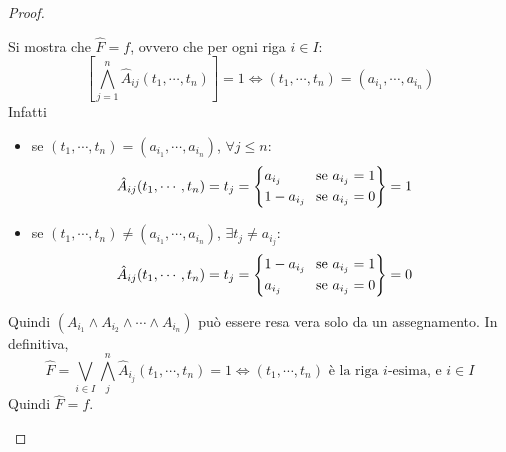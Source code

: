 \begin{proof}
\begin{itemize}
  Si mostra che $\hat{F} = f$, ovvero che per ogni riga $i \in I$:
  $$
  {[ \bigwedge\limits_ {j = 1}^{n} \hat{A}_{ij}(t_1, \cdots, t_n) ]} = 1
  \iff (t_1, \cdots, t_n) = (a_{i_1}, \cdots, a_{i_n})
  $$
  Infatti
  \begin{itemize}
  \item se $(t_1, \cdots, t_n) = (a_{i_1}, \cdots, a_{i_n})$, $\forall j \leq  n$:
    \begin{align*}
      \hat A_{ij}(t_1, \cdots, t_n) = t_j =
      \begin{cases*}
        a_{i_j} \\
        1 - a_{i_j}
      \end{cases*}
      &
      \begin{rcases*}
        \text{ se } a_{i_j} = 1 \\
        \text{ se } a_{i_j} = 0
      \end{rcases*} = 1
    \end{align*}
  \item se $(t_1, \cdots, t_n) \neq (a_{i_1}, \cdots, a_{i_n})$, $\exists t_j \neq a_{i_j}$:
    \begin{align*}
      \hat A_{ij}(t_1, \cdots, t_n) = t_j =
      \begin{cases*}
        1 - a_{i_j} \\
        a_{i_j}
      \end{cases*}
      &
      \begin{rcases*}
        \text{ se } a_{i_j} = 1 \\
        \text{ se } a_{i_j} = 0
      \end{rcases*} = 0
    \end{align*}
  \end{itemize}
  Quindi $(A_{i_1} \land A_{i_2} \land \cdots \land A_{i_n})$ può essere resa vera solo da un assegnamento. In definitiva, 
  $$
  \hat{F} = \bigvee\limits_{i\in I}\bigwedge\limits_{j}^n \hat A_{i_j}(t_1, \cdots, t_n) = 1 \iff (t_1, \cdots, t_n) \text{ è la riga } i \text{-esima, e } i \in I
  $$
  Quindi $\hat F = f$.  
\end{itemize}
\end{proof}

